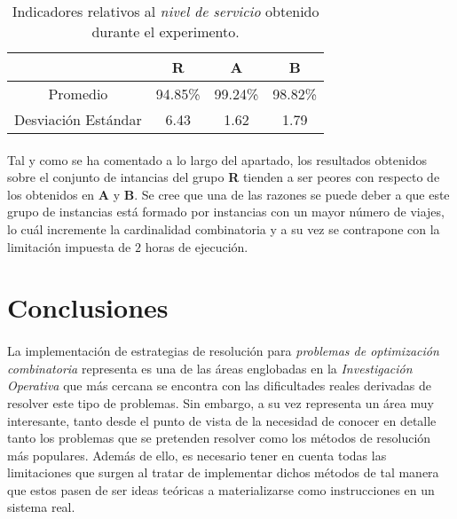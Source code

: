 \documentclass{subfiles}
\begin{document}
        \begin{table}[!ht]
          \centering
          \begin{tabu}{ | c | c | c | c |}
            \hline
            &\bfseries R & \bfseries A & \bfseries B
            \\\hline Promedio & 94.85\% & 99.24\% & 98.82\%
            \\\hline Desviación Estándar & 6.43 & 1.62 & 1.79
            \\\hline
          \end{tabu}
          \caption{Indicadores relativos al \emph{nivel de servicio} obtenido durante el experimento.}
          \label{table:service_summary}
        \end{table}

        \paragraph{}
        Tal y como se ha comentado a lo largo del apartado, los resultados obtenidos sobre el conjunto de intancias del grupo \textbf{R} tienden a ser peores con respecto de los obtenidos en \textbf{A} y \textbf{B}. Se cree que una de las razones se puede deber a que este grupo de instancias está formado por instancias con un mayor número de viajes, lo cuál incremente la cardinalidad combinatoria y a su vez se contrapone con la limitación impuesta de $2$ horas de ejecución.

    \section{Conclusiones}
    \label{sec:implementation_results_conclusions}

      \paragraph{}
      La implementación de estrategias de resolución para \emph{problemas de optimización combinatoria} representa es una de las áreas englobadas en la \emph{Investigación Operativa} que más cercana se encontra con las dificultades reales derivadas de resolver este tipo de problemas. Sin embargo, a su vez representa un área muy interesante, tanto desde el punto de vista de la necesidad de conocer en detalle tanto los problemas que se pretenden resolver como los métodos de resolución más populares. Además de ello, es necesario tener en cuenta todas las limitaciones que surgen al tratar de implementar dichos métodos de tal manera que estos pasen de ser ideas teóricas a materializarse como instrucciones en un sistema real.
\end{document}
